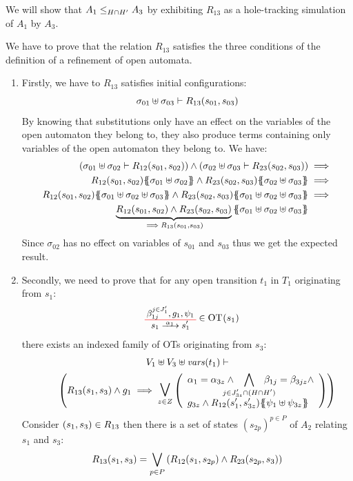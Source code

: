 \documentclass[runningheads]{llncs}
\begin{document}
We will show that $\wrel{A_1}{A_3}{H\cap H'}$ by exhibiting  $R_{13}$ as a hole-tracking simulation of $A_1$ by  $A_3$.

We have to prove that the relation $R_{13}$ satisfies the three conditions of the definition of a refinement of open automata.
\begin{enumerate}
\item Firstly, we have to $R_{13}$ satisfies initial configurations:
\[\sigma_{01} \uplus \sigma_{03} \vdash R_{13} \mpar{s_{01}, s_{03}}\]
By knowing that substitutions only have an effect on the variables of the open automaton they belong to, they also produce terms containing only variables of the open automaton they belong to. We have:
\begin{align*}
\mpar{\sigma_{01} \uplus \sigma_{02} \vdash R_{12}\mpar{s_{01}, s_{02}}} \wedge \mpar
{\sigma_{02} \uplus \sigma_{03} \vdash R_{23}\mpar{s_{02}, s_{03}}}&\implies\\
R_{12}\mpar{s_{01},s_{02}}\psubst{\sigma_{01} \uplus \sigma_{02}} \wedge R_{23}\mpar{s_{02}, s_{03}}\psubst{\sigma_{02} \uplus \sigma_{03}}&\implies\\
R_{12}\mpar{s_{01},s_{02}}\psubst{\sigma_{01} \uplus \sigma_{02} \uplus \sigma_{03}} \wedge R_{23}\mpar{s_{02}, s_{03}}\psubst{\sigma_{01} \uplus \sigma_{02} \uplus \sigma_{03}}&\implies\\ 
\underbrace{R_{12}\mpar{s_{01},s_{02}}\wedge R_{23}\mpar{s_{02}, s_{03}}}_{\implies R_{13} \mpar{s_{01}, s_{03}}}\psubst{\sigma_{01} \uplus \sigma_{02} \uplus \sigma_{03}} %
 \end{align*}
Since $\sigma_{02}$ has no effect on variables of $s_{01}$ and $s_{03}$ thus we get the expected result.

\item Secondly, we need to prove that for any open transition $t_1$ in $T_1$  originating from $s_1$:
\begin{align*}
\OTx{1}{}{1}{1} \in \fOT{s_1}
\end{align*}
there exists an indexed family of OTs originating from $s_{3}$: 
\begin{multline*}
V_1 \uplus  V_3 \uplus \fvars{t_1}
\vdash\\\hspace{2em}
\mpar{R_{13}\mpar{s_1, s_3} \wedge g_1 \implies 
\operatorname*{\bigsymb{\bigvee}}_{z \in Z}
\mpar{\everymath{\displaystyle}
\begin{array}{l}
\alpha_1=\alpha_{3z}\wedge \bigwedge_\subbox{j \in J'_{3z} \cap (H\cap H')} \beta_{1j}=\beta_{3jz} \wedge \\g_{3z}\wedge 
{R_{12}\mpar{s'_1,s'_{3z}}}\psubst{\psi_1  \uplus \psi_{3z}}
\end{array}}}
\end{multline*}	
\medskip
 Consider $\mpar{s_{1}, s_{3}} \in R_{13}$ then there is a set of states $(s_{2p})^{p\in P}$ of $A_2$ relating  $s_{1}$ and $s_{3}$:
\[R_{13}(s_1,s_3)=\bigvee_{{p\in P}
}\mpar{R_{12}\mpar{s_1,s_{2p}} \wedge R_{23}\mpar{s_{2p},s_3}} \]


\end{enumerate}
\end{document}
